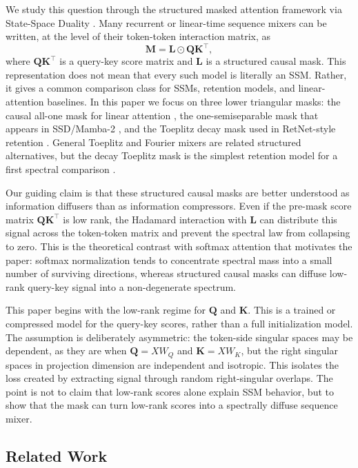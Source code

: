 \documentclass{article}
\newcommand{\hadamard}{\mathbin{\odot}}
\newcommand{\bM}{\mathbf{M}}
\newcommand{\bL}{\mathbf{L}}
\newcommand{\bQ}{\mathbf{Q}}
\newcommand{\bK}{\mathbf{K}}
\theoremstyle{remark}
\begin{document}
We study this question through the structured masked attention framework via State-Space Duality \citep{dao:2024transformers}.  Many recurrent or linear-time
sequence mixers can be written, at the level of their token-token interaction
matrix, as
\[
        \bM=\bL\hadamard \bQ\bK^\top ,
\]
where $\bQ\bK^\top$ is a query-key score matrix and $\bL$ is a structured
causal mask.  This representation does not mean that every such model is
literally an SSM.  Rather, it gives a common comparison class for SSMs,
retention models, and linear-attention baselines.  In this paper we focus on
three lower triangular masks: the causal all-one mask for linear attention
\citep{katharopoulos:2020transformers}, the one-semiseparable mask that appears
in SSD/Mamba-2 \citep{gu:2023mamba,dao:2024transformers}, and the Toeplitz
decay mask used in RetNet-style retention \citep{sun:2023retentive}.  General
Toeplitz and Fourier mixers are related structured alternatives, but the decay
Toeplitz mask is the simplest retention model for a first spectral comparison
\citep{qin:2023toeplitz,leethorp:2021fnet}.

Our guiding claim is that these structured causal masks are better understood
as information diffusers than as information compressors.  Even if the
pre-mask score matrix $\bQ\bK^\top$ is low rank, the Hadamard interaction with
$\bL$ can distribute this signal across the token-token matrix and prevent the
spectral law from collapsing to zero.  This is the theoretical contrast with
softmax attention that motivates the paper: softmax normalization tends to
concentrate spectral mass into a small number of surviving directions, whereas
structured causal masks can diffuse low-rank query-key signal into a
non-degenerate spectrum.

This paper begins with the low-rank regime for $\bQ$ and $\bK$.  This is a
trained or compressed model for the query-key scores, rather than a full
initialization model.  The assumption is deliberately asymmetric: the token-side
singular spaces may be dependent, as they are when $\bQ=XW_Q$ and $\bK=XW_K$,
but the right singular spaces in projection dimension are independent and
isotropic.  This isolates the loss created by extracting signal through random
right-singular overlaps.  The point is not to claim that low-rank scores alone
explain SSM behavior, but to show that the mask can turn low-rank scores into a
spectrally diffuse sequence mixer.

\subsection{Related Work}
\end{document}
